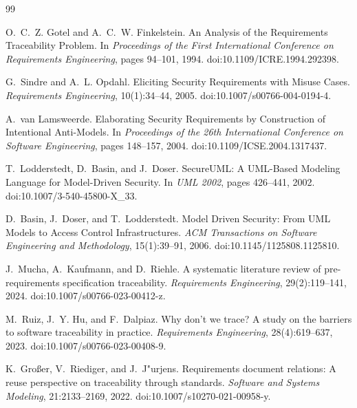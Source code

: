 \documentclass[12pt,a4paper,oneside]{report}
\begin{document}
\clearpage
\begin{thebibliography}{99}

O.~C.~Z. Gotel and A.~C.~W. Finkelstein.
\newblock An Analysis of the Requirements Traceability Problem.
\newblock In \emph{Proceedings of the First International Conference on Requirements Engineering}, pages 94--101, 1994.
\newblock doi:10.1109/ICRE.1994.292398.

G.~Sindre and A.~L. Opdahl.
\newblock Eliciting Security Requirements with Misuse Cases.
\newblock \emph{Requirements Engineering}, 10(1):34--44, 2005.
\newblock doi:10.1007/s00766-004-0194-4.

A.~van Lamsweerde.
\newblock Elaborating Security Requirements by Construction of Intentional Anti-Models.
\newblock In \emph{Proceedings of the 26th International Conference on Software Engineering}, pages 148--157, 2004.
\newblock doi:10.1109/ICSE.2004.1317437.

T.~Lodderstedt, D.~Basin, and J.~Doser.
\newblock SecureUML: A UML-Based Modeling Language for Model-Driven Security.
\newblock In \emph{UML 2002}, pages 426--441, 2002.
\newblock doi:10.1007/3-540-45800-X\_33.

D.~Basin, J.~Doser, and T.~Lodderstedt.
\newblock Model Driven Security: From UML Models to Access Control Infrastructures.
\newblock \emph{ACM Transactions on Software Engineering and Methodology}, 15(1):39--91, 2006.
\newblock doi:10.1145/1125808.1125810.

J.~Mucha, A.~Kaufmann, and D.~Riehle.
\newblock A systematic literature review of pre-requirements specification traceability.
\newblock \emph{Requirements Engineering}, 29(2):119--141, 2024.
\newblock doi:10.1007/s00766-023-00412-z.

M.~Ruiz, J.~Y. Hu, and F.~Dalpiaz.
\newblock Why don't we trace? A study on the barriers to software traceability in practice.
\newblock \emph{Requirements Engineering}, 28(4):619--637, 2023.
\newblock doi:10.1007/s00766-023-00408-9.

K.~Gro{\ss}er, V.~Riediger, and J.~J{"u}rjens.
\newblock Requirements document relations: A reuse perspective on traceability through standards.
\newblock \emph{Software and Systems Modeling}, 21:2133--2169, 2022.
\newblock doi:10.1007/s10270-021-00958-y.


\end{thebibliography}
\end{document}
